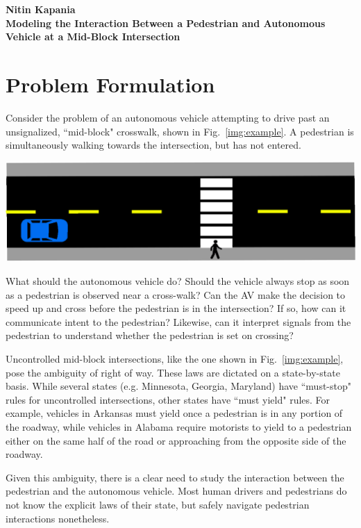 \documentclass[11pt]{article}
\begin{document}
\textbf{Nitin Kapania} \\
\textbf{Modeling the Interaction Between a Pedestrian and Autonomous Vehicle at a Mid-Block Intersection} \\ 

\section{Problem Formulation}
Consider the problem of an autonomous vehicle attempting to drive past an unsignalized, ``mid-block" crosswalk, shown in Fig.~\ref{img:example}. A pedestrian is simultaneously walking towards the intersection, but has not entered. 

\begin{center}
   \includegraphics[width=.8\textwidth]{Images/example.eps}
   \label{img:example}
\end{center}

What should the autonomous vehicle do? Should the vehicle always stop as soon as a pedestrian is observed near a cross-walk? Can the AV make the decision to speed up and cross before the pedestrian is in the intersection? If so, how can it communicate intent to the pedestrian? Likewise, can it interpret signals from the pedestrian to understand whether the pedestrian is set on crossing? 

Uncontrolled mid-block intersections, like the one shown in Fig.~\ref{img:example}, pose the ambiguity of right of way. These laws are dictated on a state-by-state basis. While several states (e.g. Minnesota, Georgia, Maryland) have ``must-stop" rules for uncontrolled intersections, other states have ``must yield" rules. For example, vehicles in Arkansas must yield once a pedestrian is in any portion of the roadway, while vehicles in Alabama require motorists to yield to a pedestrian either on the same half of the road or approaching from the opposite side of the roadway. 

Given this ambiguity, there is a clear need to study the interaction between the pedestrian and the autonomous vehicle. Most human drivers and pedestrians do not know the explicit laws of their state, but safely navigate pedestrian interactions nonetheless. 
\end{document}
